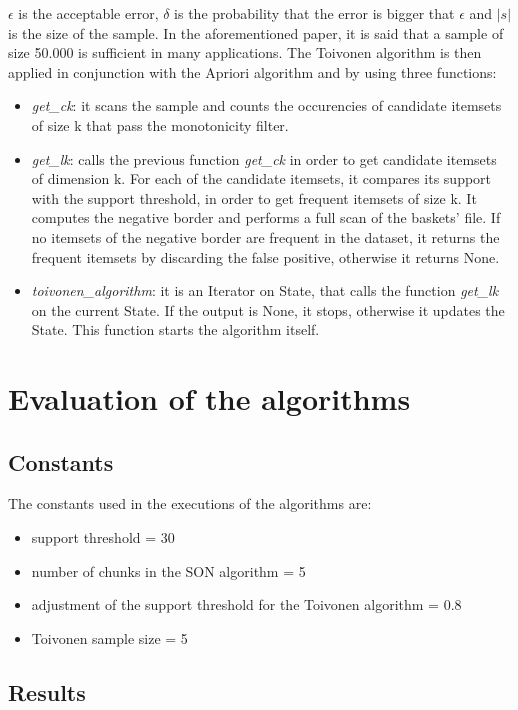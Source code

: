 \documentclass[conference,compsoc]{IEEEtran}
\theoremstyle{definition}
\begin{document}
\(\epsilon\) is the acceptable error, \(\delta\) is the probability that the error is bigger that \(\epsilon\) and \(|s|\) is the size of the sample. In the aforementioned paper, it is said that a sample of size 50.000 is sufficient in many applications. 
The Toivonen algorithm is then applied in conjunction with the Apriori algorithm and by using three functions:
\begin{itemize}
    \item \emph{get\_ck}: it scans the sample and counts the occurencies of candidate itemsets of size k that pass the monotonicity filter. 
    \item \emph{get\_lk}: calls the previous function \emph{get\_ck} in order to get candidate itemsets of dimension k. For each of the candidate itemsets, it compares its support with the support threshold, in order to get frequent itemsets of size k. It computes the negative border and performs a full scan of the baskets' file. 
    If no itemsets of the negative border are frequent in the dataset, it returns the frequent itemsets by discarding the false positive, otherwise it returns None.
    \item \emph{toivonen\_algorithm}: it is an Iterator on State, that calls the function \emph{get\_lk} on the current State. If the output is None, it stops, otherwise it updates the State. This function starts the algorithm itself. 
\end{itemize}

\section{Evaluation of the algorithms}

\subsection{Constants}

The constants used in the executions of the algorithms are:
\begin{itemize}
    \item support threshold = 30
    \item number of chunks in the SON algorithm = 5
    \item adjustment of the support threshold for the Toivonen algorithm = 0.8
    \item Toivonen sample size = 5

\end{itemize}
\subsection{Results}
\end{document}
